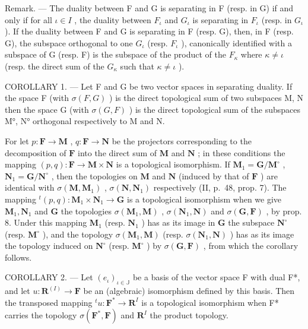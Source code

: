 Remark. --- The duality between F and G is separating in F (resp. in G) if and only if for all \(\iota\in I\) , the duality between \(F_{\iota}\) and \(G_{\iota}\) is separating in \(F_{\iota}\) (resp. in \(G_{\iota}\) ). If the duality between F and G is separating in F (resp. G), then, in F (resp. G), the subspace orthogonal to one \(G_{\iota}\) (resp. \(F_{\iota}\) ), canonically identified with a subspace of G (resp. F) is the subspace of the product of the \(F_{\kappa}\) where \(\kappa\neq\iota\) (resp. the direct sum of the \(G_{\kappa}\) such that \(\kappa\neq\iota\) ).

COROLLARY 1. --- Let F and G be two vector spaces in separating duality. If the space F (with \(\sigma(F, G)\) ) is the direct topological sum of two subspaces M, N then the space G (with \(\sigma(G, F)\) ) is the direct topological sum of the subspaces M°, N° orthogonal respectively to M and N.

For let \(p: \mathbf{F} \to \mathbf{M}\) , \(q: \mathbf{F} \to \mathbf{N}\) be the projectors corresponding to the decomposition of \(\mathbf{F}\) into the direct sum of \(\mathbf{M}\) and \(\mathbf{N}\) ; in these conditions the mapping \((p, q): \mathbf{F} \to \mathbf{M} \times \mathbf{N}\) is a topological isomorphism. If \(\mathbf{M}_1 = \mathbf{G} / \mathbf{M}^\circ\) , \(\mathbf{N}_1 = \mathbf{G} / \mathbf{N}^\circ\) , then the topologies on \(\mathbf{M}\) and \(\mathbf{N}\) (induced by that of \(\mathbf{F}\) ) are identical with \(\sigma(\mathbf{M}, \mathbf{M}_1)\) , \(\sigma(\mathbf{N}, \mathbf{N}_1)\) respectively (II, p.~48, prop. 7). The mapping \(^t(p, q): \mathbf{M}_1 \times \mathbf{N}_1 \to \mathbf{G}\) is a topological isomorphism when we give \(\mathbf{M}_1, \mathbf{N}_1\) and \(\mathbf{G}\) the topologies \(\sigma(\mathbf{M}_1, \mathbf{M})\) , \(\sigma(\mathbf{N}_1, \mathbf{N})\) and \(\sigma(\mathbf{G}, \mathbf{F})\) , by prop. 8. Under this mapping \(\mathbf{M}_1\) (resp. \(\mathbf{N}_1\) ) has as its image in \(\mathbf{G}\) the subspace \(\mathbf{N}^\circ\) (resp. \(\mathbf{M}^\circ\) ), and the topology \(\sigma(\mathbf{M}_1, \mathbf{M})\) (resp. \(\sigma(\mathbf{N}_1, \mathbf{N})\) ) has as its image the topology induced on \(\mathbf{N}^\circ\) (resp. \(\mathbf{M}^\circ\) ) by \(\sigma(\mathbf{G}, \mathbf{F})\) , from which the corollary follows.

COROLLARY 2. --- Let \((e_{\iota})_{\iota \in \mathbb{J}}\) be a basis of the vector space F with dual F*, and let \(u: \mathbf{R}^{(I)} \to \mathbf{F}\) be an (algebraic) isomorphism defined by this basis. Then the transposed mapping \({}^t u: \mathbf{F}^* \to \mathbf{R}^I\) is a topological isomorphism when F* carries the topology \(\sigma(\mathbf{F}^*, \mathbf{F})\) and \(\mathbf{R}^I\) the product topology.

